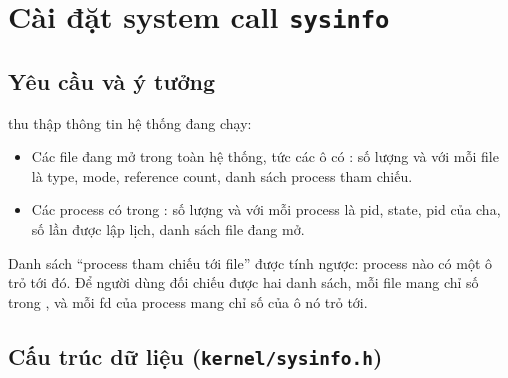 \section{Cài đặt system call \texttt{sysinfo}}
\label{sec:sysinfo}

\subsection{Yêu cầu và ý tưởng}

 thu thập thông tin hệ thống đang chạy:
\begin{itemize}
  \item Các file đang mở trong toàn hệ thống, tức các ô 
        có : số lượng và với mỗi file là type, mode, reference count,
        danh sách process tham chiếu.
  \item Các process có  trong : số lượng và với
        mỗi process là pid, state, pid của cha, số lần được lập lịch, danh sách
        file đang mở.
\end{itemize}

Danh sách ``process tham chiếu tới file'' được tính ngược: process nào có một
ô  trỏ tới  đó. Để người dùng đối chiếu được hai
danh sách, mỗi file mang chỉ số  trong , và mỗi fd của
process mang chỉ số  của ô nó trỏ tới.

\subsection{Cấu trúc dữ liệu (\texttt{kernel/sysinfo.h})}

